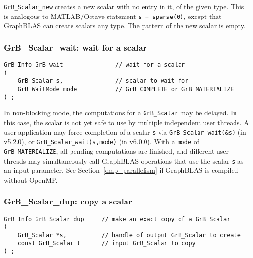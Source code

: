 \documentclass[12pt]{article}
\begin{document}
\verb'GrB_Scalar_new' creates a new scalar with no
entry in it, of the given type.  This is analogous to MATLAB/Octave statement
\verb's = sparse(0)', except that GraphBLAS can create scalars any
type.  The pattern of the new scalar is empty.

\subsubsection{{\sf GrB\_Scalar\_wait:} wait for a scalar}
\label{scalar_wait}

\begin{mdframed}[userdefinedwidth=6in]
{\footnotesize
\begin{verbatim}
GrB_Info GrB_wait               // wait for a scalar
(
    GrB_Scalar s,               // scalar to wait for
    GrB_WaitMode mode           // GrB_COMPLETE or GrB_MATERIALIZE
) ;
\end{verbatim}
}\end{mdframed}

In non-blocking mode, the computations for a \verb'GrB_Scalar' may be delayed.
In this case, the scalar is not yet safe to use by multiple independent user
threads.  A user application may force completion of a scalar \verb's' via
\verb'GrB_Scalar_wait(&s)' (in v5.2.0), or
\verb'GrB_Scalar_wait(s,mode)' (in v6.0.0).
With a \verb'mode' of \verb'GrB_MATERIALIZE',
all pending computations are finished, and different user threads may
simultaneously call GraphBLAS operations that use the scalar \verb's' as an
input parameter.
See Section~\ref{omp_parallelism}
if GraphBLAS is compiled without OpenMP.

\subsubsection{{\sf GrB\_Scalar\_dup:} copy a scalar}
\label{scalar_dup}

\begin{mdframed}[userdefinedwidth=6in]
{\footnotesize
\begin{verbatim}
GrB_Info GrB_Scalar_dup     // make an exact copy of a GrB_Scalar
(
    GrB_Scalar *s,          // handle of output GrB_Scalar to create
    const GrB_Scalar t      // input GrB_Scalar to copy
) ;
\end{verbatim}
} \end{mdframed}
\end{document}
